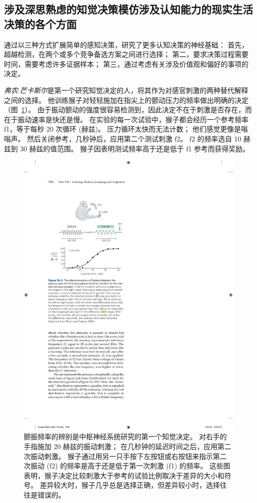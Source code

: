\subsection{涉及深思熟虑的知觉决策模仿涉及认知能力的现实生活决策的各个方面}

通过以三种方式扩展简单的感知决策，研究了更多认知决策的神经基础：
首先，超越检测，在两个或多个竞争备选方案之间进行选择；
第二，要求决策过程需要时间，需要考虑许多证据样本； 第三，通过考虑有关涉及价值观和偏好的事项的决定。


\textit{弗农$\cdot$芒卡斯尔}是第一个研究知觉决定的人，将其作为对感官刺激的两种替代解释之间的选择。
他训练猴子对轻轻施加在指尖上的颤动压力的频率做出明确的决定（图~\ref{fig:56_2}）。
由于振动颤动的强度很容易检测到，因此决定不在于刺激是否存在，而在于振动速率是快还是慢。
在实验的每一次试验中，猴子都会经历一个参考频率 f1，等于每秒 20 次循环 (赫兹)。
压力循环太快而无法计数； 他们感觉更像是嗡嗡声。
然后关闭参考，几秒钟后，应用第二个测试刺激 f2。
f2 的频率选自 10 赫兹到 30 赫兹的值范围。
猴子因表明测试频率高于还是低于 f1 参考而获得奖励。


\begin{figure}[htbp]
	\centering
	\includegraphics[width=0.65\linewidth]{chap56/fig_56_2}
	\caption{颤振频率的辨别是中枢神经系统研究的第一个知觉决定。
		对右手的手指施加 20 赫兹的振动刺激；
		在几秒钟的延迟时间之后，应用第二次振动刺激。
		猴子通过用另一只手按下左按钮或右按钮来指示第二次振动 (f2) 的频率是高于还是低于第一次刺激 (f1) 的频率。
		这些图表明，猴子决定比较刺激大于参考的试验比例取决于差异的大小和符号。
		差异较大时，猴子几乎总是选择正确，但差异较小时，选择往往是错误的\cite{romo2001touch}。}
	\label{fig:56_2}
\end{figure}


